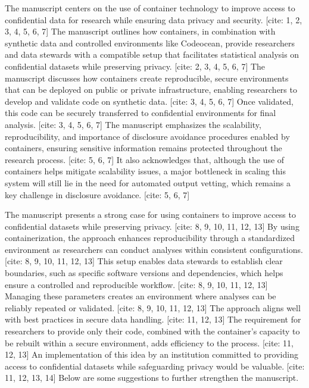 \begin{referee}
    
The manuscript centers on the use of container technology to improve access to confidential data for research while ensuring data privacy and security. [cite: 1, 2, 3, 4, 5, 6, 7] The manuscript outlines how containers, in combination with synthetic data and controlled environments like Codeocean, provide researchers and data stewards with a compatible setup that facilitates statistical analysis on confidential datasets while preserving privacy. [cite: 2, 3, 4, 5, 6, 7] The manuscript discusses how containers create reproducible, secure environments that can be deployed on public or private infrastructure, enabling researchers to develop and validate code on synthetic data. [cite: 3, 4, 5, 6, 7] Once validated, this code can be securely transferred to confidential environments for final analysis. [cite: 3, 4, 5, 6, 7] The manuscript emphasizes the scalability, reproducibility, and importance of disclosure avoidance procedures enabled by containers, ensuring sensitive information remains protected throughout the research process. [cite: 5, 6, 7] It also acknowledges that, although the use of containers helps mitigate scalability issues, a major bottleneck in scaling this system will still lie in the need for automated output vetting, which remains a key challenge in disclosure avoidance. [cite: 5, 6, 7]

The manuscript presents a strong case for using containers to improve access to confidential datasets while preserving privacy. [cite: 8, 9, 10, 11, 12, 13] By using containerization, the approach enhances reproducibility through a standardized environment as researchers can conduct analyses within consistent configurations. [cite: 8, 9, 10, 11, 12, 13] This setup enables data stewards to establish clear boundaries, such as specific software versions and dependencies, which helps ensure a controlled and reproducible workflow. [cite: 8, 9, 10, 11, 12, 13] Managing these parameters creates an environment where analyses can be reliably repeated or validated. [cite: 8, 9, 10, 11, 12, 13] The approach aligns well with best practices in secure data handling. [cite: 11, 12, 13] The requirement for researchers to provide only their code, combined with the container's capacity to be rebuilt within a secure environment, adds efficiency to the process. [cite: 11, 12, 13] An implementation of this idea by an institution committed to providing access to confidential datasets while safeguarding privacy would be valuable. [cite: 11, 12, 13, 14] Below are some suggestions to further strengthen the manuscript.


\end{referee}
